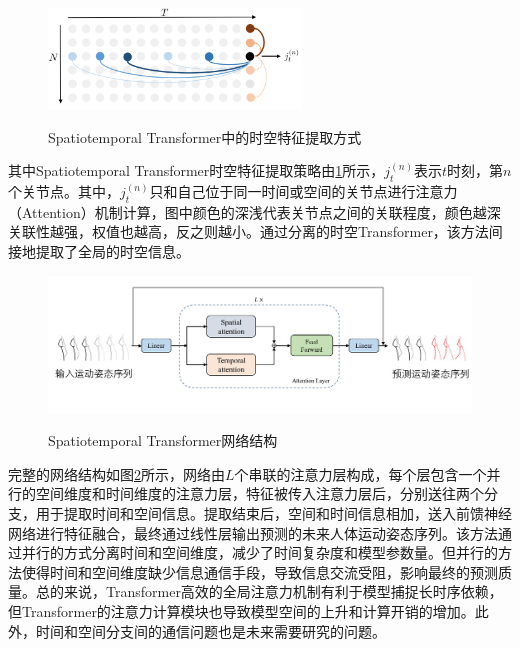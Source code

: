 \begin{figure}[ht]
    \centering
    \includegraphics[width=0.6\textwidth]{FigMa/ST-Transformer.png}\\
    \vspace{-0.3cm}
    \caption{Spatiotemporal Transformer\parencite{aksan2021spatio}中的时空特征提取方式}
    \label{fig:Spatial-temporal_Transformer}
\end{figure}
其中Spatiotemporal Transformer时空特征提取策略由\ref{fig:Spatial-temporal_Transformer}所示，$j^{(n)}_t$表示$t$时刻，第$n$个关节点。其中，$j^{(n)}_t$只和自己位于同一时间或空间的关节点进行注意力（Attention）机制计算，图中颜色的深浅代表关节点之间的关联程度，颜色越深关联性越强，权值也越高，反之则越小。通过分离的时空Transformer，该方法间接地提取了全局的时空信息。

\begin{figure}[h]
    \centering
    \includegraphics[width=1\textwidth]{FigMa/ST_Transformer.png}\\
    \vspace{-0.3cm}
    \caption{Spatiotemporal Transformer\parencite{aksan2021spatio}网络结构}
    \label{fig:Spatial-temporal_Transformer_structure}
\end{figure}
完整的网络结构如图\ref{fig:Spatial-temporal_Transformer_structure}所示，网络由$L$个串联的注意力层构成，每个层包含一个并行的空间维度和时间维度的注意力层，特征被传入注意力层后，分别送往两个分支，用于提取时间和空间信息。提取结束后，空间和时间信息相加，送入前馈神经网络进行特征融合，最终通过线性层输出预测的未来人体运动姿态序列。该方法通过并行的方式分离时间和空间维度，减少了时间复杂度和模型参数量。但并行的方法使得时间和空间维度缺少信息通信手段，导致信息交流受阻，影响最终的预测质量。总的来说，Transformer高效的全局注意力机制有利于模型捕捉长时序依赖，但Transformer的注意力计算模块也导致模型空间的上升和计算开销的增加。此外，时间和空间分支间的通信问题也是未来需要研究的问题。

